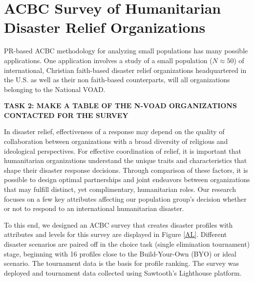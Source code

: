 \documentclass[a4paper, 12pt]{article}
\begin{document}
{\section{ACBC Survey of Humanitarian Disaster Relief Organizations}

PR-based ACBC methodology for analyzing small populations has many possible applications. One application involves  a study of a small population ($N\approx 50$) of international, Christian faith-based disaster relief organizations headquartered in the U.S. as well as their non faith-based counterparts, will all organizations belonging to the National VOAD.




{\bf TASK 2: MAKE A TABLE OF THE N-VOAD ORGANIZATIONS CONTACTED FOR THE SURVEY} 

In disaster relief, effectiveness of a response may depend on the quality of collaboration between organizations with a broad diversity of religious and ideological perspectives. For effective coordination of relief, it is important that humanitarian organizations understand the unique traits and characteristics that shape their disaster response decisions. Through comparison of these factors, it is possible to design optimal partnerships and joint endeavors between organizations that may fulfill distinct, yet complimentary, humanitarian roles. Our research focuses on a few key attributes affecting our population group's decision whether or not to respond to an international humanitarian disaster.


To this end, we designed an ACBC survey that creates disaster profiles with attributes and levels for this survey are displayed in Figure \ref{AL}. Different disaster scenarios are paired off  in the choice task (single elimination tournament) stage, beginning with 16 profiles close to the Build-Your-Own (BYO) or ideal scenario. The tournament data is the basis for profile ranking. The survey was deployed and tournament data collected using Sawtooth's Lighthouse platform.



}
\end{document}
